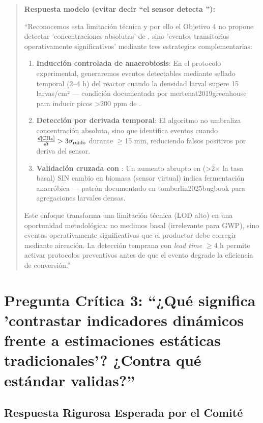 \documentclass[12pt,oneside]{book}
\begin{document}
\begin{quote}
\textbf{Respuesta modelo (evitar decir ``el sensor detecta ''):}

``Reconocemos esta limitación técnica y por ello el Objetivo 4 no propone detectar 'concentraciones absolutas' de , sino 'eventos transitorios operativamente significativos' mediante tres estrategias complementarias:

\begin{enumerate}
    \item \textbf{Inducción controlada de anaerobiosis}: En el protocolo experimental, generaremos eventos detectables mediante sellado temporal (2--4 h) del reactor cuando la densidad larval supere 15 larvas/cm² --- condición documentada por mertenat2019greenhouse para inducir picos >200 ppm de .
    
    \item \textbf{Detección por derivada temporal}: El algoritmo no umbraliza concentración absoluta, sino que identifica eventos cuando $\frac{d[\ce{CH4}]}{dt} > 3\sigma_{\text{ruido}}$ durante $\geq$15 min, reduciendo falsos positivos por deriva del sensor.
    
    \item \textbf{Validación cruzada con }: Un aumento abrupto en  (>2$\times$ la tasa basal) SIN cambio en biomasa (sensor virtual) indica fermentación anaeróbica --- patrón documentado en tomberlin2025bugbook para agregaciones larvales densas.
\end{enumerate}

Este enfoque transforma una limitación técnica (LOD alto) en una oportunidad metodológica: no medimos  basal (irrelevante para GWP), sino eventos operativamente significativos que el productor debe corregir mediante aireación. La detección temprana con \textit{lead time} $\geq$4 h permite activar protocolos preventivos antes de que el evento degrade la eficiencia de conversión.''
\end{quote}

\section{Pregunta Crítica 3: ``¿Qué significa 'contrastar indicadores dinámicos frente a estimaciones estáticas tradicionales'? ¿Contra qué estándar validas?''}

\subsection{Respuesta Rigurosa Esperada por el Comité}
\end{document}
